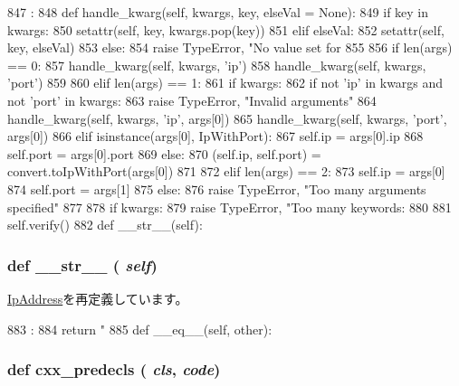 \begin{DoxyCode}
847                                        :
848         def handle_kwarg(self, kwargs, key, elseVal = None):
849             if key in kwargs:
850                 setattr(self, key, kwargs.pop(key))
851             elif elseVal:
852                 setattr(self, key, elseVal)
853             else:
854                 raise TypeError, "No value set for %
855 
856         if len(args) == 0:
857             handle_kwarg(self, kwargs, 'ip')
858             handle_kwarg(self, kwargs, 'port')
859 
860         elif len(args) == 1:
861             if kwargs:
862                 if not 'ip' in kwargs and not 'port' in kwargs:
863                     raise TypeError, "Invalid arguments"
864                 handle_kwarg(self, kwargs, 'ip', args[0])
865                 handle_kwarg(self, kwargs, 'port', args[0])
866             elif isinstance(args[0], IpWithPort):
867                 self.ip = args[0].ip
868                 self.port = args[0].port
869             else:
870                 (self.ip, self.port) = convert.toIpWithPort(args[0])
871 
872         elif len(args) == 2:
873             self.ip = args[0]
874             self.port = args[1]
875         else:
876             raise TypeError, "Too many arguments specified"
877 
878         if kwargs:
879             raise TypeError, "Too many keywords: %
880 
881         self.verify()
882 
    def __str__(self):
\end{DoxyCode}
\hypertarget{classm5_1_1params_1_1IpWithPort_aa7a4b9bc0941308e362738503137460e}{
\subsubsection[{\_\-\_\-str\_\-\_\-}]{\setlength{\rightskip}{0pt plus 5cm}def \_\-\_\-str\_\-\_\- ( {\em self})}}
\label{classm5_1_1params_1_1IpWithPort_aa7a4b9bc0941308e362738503137460e}


\hyperlink{classm5_1_1params_1_1IpAddress_aa7a4b9bc0941308e362738503137460e}{IpAddress}を再定義しています。


\begin{DoxyCode}
883                      :
884         return "%
885 
    def __eq__(self, other):
\end{DoxyCode}
\hypertarget{classm5_1_1params_1_1IpWithPort_a0b408a11a14bd1d770e28f71a6e14ab5}{
\subsubsection[{cxx\_\-predecls}]{\setlength{\rightskip}{0pt plus 5cm}def cxx\_\-predecls ( {\em cls}, \/   {\em code})}}
\label{classm5_1_1params_1_1IpWithPort_a0b408a11a14bd1d770e28f71a6e14ab5}


